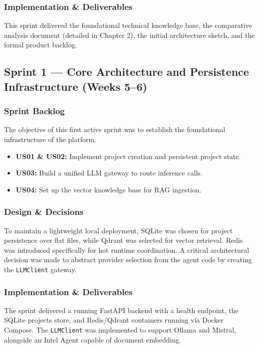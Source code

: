 \documentclass[12pt,a4paper]{report}
\begin{document}
\subsubsection{Implementation \& Deliverables}
This sprint delivered the foundational technical knowledge base, the comparative analysis document (detailed in Chapter 2), the initial architecture sketch, and the formal product backlog.

\subsection{Sprint 1 --- Core Architecture and Persistence Infrastructure (Weeks 5--6)}

\subsubsection{Sprint Backlog}
The objective of this first active sprint was to establish the foundational infrastructure of the platform.
\begin{itemize}
    \item \textbf{US01 \& US02:} Implement project creation and persistent project state.
    \item \textbf{US03:} Build a unified LLM gateway to route inference calls.
    \item \textbf{US04:} Set up the vector knowledge base for RAG ingestion.
\end{itemize}

\subsubsection{Design \& Decisions}
To maintain a lightweight local deployment, SQLite was chosen for project persistence over flat files, while Qdrant was selected for vector retrieval. Redis was introduced specifically for hot runtime coordination. A critical architectural decision was made to abstract provider selection from the agent code by creating the \texttt{LLMClient} gateway.

\subsubsection{Implementation \& Deliverables}
The sprint delivered a running FastAPI backend with a health endpoint, the SQLite projects store, and Redis/Qdrant containers running via Docker Compose. The \texttt{LLMClient} was implemented to support Ollama and Mistral, alongside an Intel Agent capable of document embedding.
\end{document}
